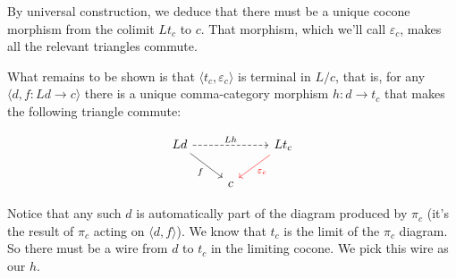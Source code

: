 \documentclass[DaoFP]{subfiles}
\begin{document}
By universal construction, we deduce that there must be a unique cocone morphism from the colimit $L t_c$ to $c$. That morphism, which we'll call $\varepsilon_c$, makes all the relevant triangles commute. 

What remains to be shown is that $\langle t_c, \varepsilon_c \rangle$ is terminal in $L/c$, that is, for any  $\langle d, f \colon L d \to c \rangle$ there is a unique comma-category morphism $h \colon d \to t_c$ that makes the following triangle commute:

\[
 \begin{tikzcd}
 L d
 \arrow[rd, "f"']
 \arrow[rr, dashed, "L h"]
 && L t_c
 \arrow[ld, red, "\varepsilon_c"]
 \\
 &c
  \end{tikzcd}
\]

Notice that any such $d$ is automatically part of the diagram produced by $\pi_c$ (it's the result of $\pi_c$ acting on $\langle d, f \rangle$). We know that $t_c$ is the limit of the $\pi_c$ diagram. So there must be a wire from $d$ to $t_c$ in the limiting cocone. We pick this wire as our $h$. 
\end{document}
